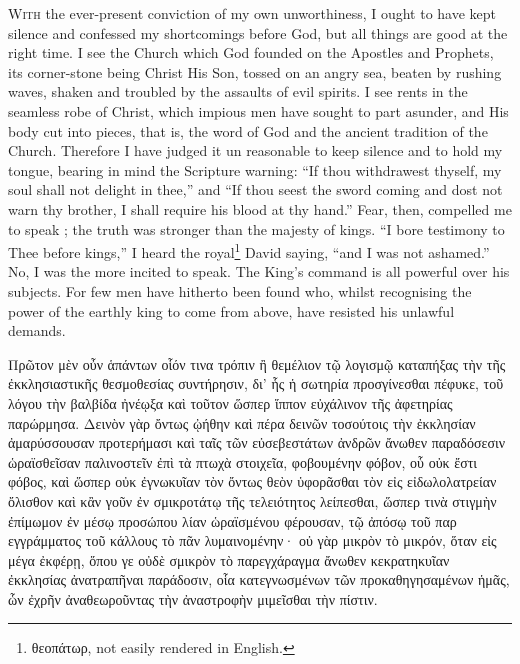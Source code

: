 \documentclass[10pt]{book}
\newcommand{\switchgreek}[1][]{\selectlanguage{polutonikogreek} \switchcolumn*[#1]}
\newcommand{\switchenglish}{\selectlanguage{english} \switchcolumn}
\begin{document}
\begin{paracol}{2}
\switchenglish

\lettrine{W}{ith} the ever-present conviction of my own
unworthiness, I ought to have kept silence and
confessed my shortcomings before God, but all
things are good at the right time. I see the
Church which God founded on the Apostles
and Prophets, its corner-stone being Christ His
Son, tossed on an angry sea, beaten by rushing
waves, shaken and troubled by the assaults of
evil spirits. I see rents in the seamless robe of
Christ, which impious men have sought to part
asunder, and His body cut into pieces, that is,
the word of God and the ancient tradition of
the Church. Therefore I have judged it un
reasonable to keep silence and to hold my
tongue, bearing in mind the Scripture warning:\textemdash
``If thou withdrawest thyself, my soul 
shall not delight in thee,'' and ``If thou seest 
the sword coming and dost not warn thy 
brother, I shall require his blood at thy hand.'' 
Fear, then, compelled me to speak ; the truth 
was stronger than the majesty of kings.
``I bore testimony to Thee before kings,''
I heard  the royal\footnote{θεοπάτωρ, not easily rendered in English.}
David saying, ``and I was not ashamed.''
No, I was the more incited to 
speak. The King's command is all powerful 
over his subjects. For few men have hitherto 
been found who, whilst recognising the power 
of the earthly king to come from above, have 
resisted his unlawful demands. 

\switchgreek

Πρῶτον μὲν οὖν ἁπάντων οἷόν τινα τρόπιν ἢ θεμέλιον τῷ λογισμῷ καταπήξας τὴν
τῆς ἐκκλησιαστικῆς θεσμοθεσίας συντήρησιν, δι’ ἧς ἡ σωτηρία προσγίνεσθαι
πέφυκε, τοῦ λόγου τὴν βαλβίδα ἠνέῳξα καὶ τοῦτον ὥσπερ ἵππον εὐχάλινον τῆς
ἀφετηρίας παρώρμησα.  Δεινὸν γὰρ ὄντως ᾠήθην καὶ πέρα δεινῶν τοσούτοις τὴν
ἐκκλησίαν ἀμαρύσσουσαν προτερήμασι καὶ ταῖς τῶν εὐσεβεστάτων ἀνδρῶν ἄνωθεν
παραδόσεσιν ὡραϊσθεῖσαν παλινοστεῖν ἐπὶ τὰ πτωχὰ στοιχεῖα, φοβουμένην φόβον,
οὗ οὐκ ἔστι φόβος, καὶ ὥσπερ οὐκ ἐγνωκυῖαν τὸν ὄντως θεὸν ὑφορᾶσθαι τὸν εἰς
εἰδωλολατρείαν ὄλισθον καὶ κἂν γοῦν ἐν σμικροτάτῳ τῆς τελειότητος λείπεσθαι,
ὥσπερ τινὰ στιγμὴν ἐπίμωμον ἐν μέσῳ προσώπου λίαν ὡραϊσμένου φέρουσαν, τῷ
ἀπόσῳ τοῦ παρ εγγράμματος τοῦ κάλλους τὸ πᾶν λυμαινομένην· οὐ γὰρ μικρὸν τὸ
μικρόν, ὅταν εἰς μέγα ἐκφέρῃ, ὅπου γε οὐδὲ σμικρὸν τὸ παρεγχάραγμα ἄνωθεν
κεκρατηκυῖαν ἐκκλησίας ἀνατραπῆναι παράδοσιν, οἷα κατεγνωσμένων τῶν
προκαθηγησαμένων ἡμᾶς, ὧν ἐχρῆν ἀναθεωροῦντας τὴν ἀναστροφὴν μιμεῖσθαι τὴν
πίστιν.

\switchenglish


\end{paracol}
\end{document}
